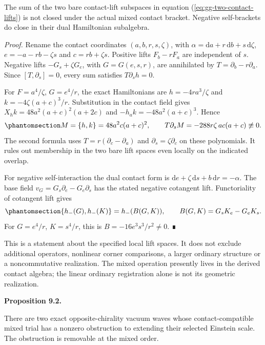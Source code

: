 \documentclass[
  english,
  11pt,
  reqno]{amsart}
\makeatletter
\newcommand{\pandocstatementheading}[1]{%
  \par\addpenalty{\@beginparpenalty}%
  \addvspace{.5\baselineskip plus .2\baselineskip minus .2\baselineskip}%
  {\normalfont\bfseries #1\par}%
  \nobreak\@afterindenttrue\@afterheading
}
\makeatother
\begin{document}
The sum of the two bare contact-lift subspaces in equation
(\ref{eq:gg-two-contact-lifts}) is not closed under the actual mixed
contact bracket. Negative self-brackets do close in their dual
Hamiltonian subalgebra.

\emph{Proof.} Rename the contact coordinates \((a,b,r,s,\zeta)\), with
\(\alpha=\mathrm da+r\,\mathrm db+s\,\mathrm d\zeta\),
\(e=-a-rb-\zeta s\) and \(c=rb+\zeta s\). Positive lifts \(F_b-rF_a\)
are independent of \(s\). Negative lifts \(-G_s+\zeta G_e\), with
\(G=G(e,s,r)\), are annihilated by \(T=\partial_b-r\partial_a\). Since
\([T,\partial_s]=0\), every sum satisfies \(T\partial_s h=0\).

For \(F=a^4/\zeta\), \(G=e^4/r\), the exact Hamiltonians are
\(h=-4ra^3/\zeta\) and \(k=-4\zeta(a+c)^3/r\). Substitution in the
contact field gives \(X_hk=48a^2(a+c)^2(a+2c)\) and
\(-h_a k=-48a^2(a+c)^3\). Hence
\begin{equation}\protect\phantomsection\label{eq:gg-mixed-nonclosure}{
 M=\{h,k\}=48a^2c(a+c)^2,\qquad
 T\partial_sM=-288r\zeta\,ac(a+c)\not\equiv0 .
}\end{equation} The second formula uses \(T=r(\partial_c-\partial_a)\)
and \(\partial_s=\zeta\partial_c\) on these polynomials. It rules out
membership in the two bare lift spaces even locally on the indicated
overlap.

For negative self-interaction the dual contact form is
\(\mathrm de+\zeta\,\mathrm ds+b\,\mathrm dr=-\alpha\). The base field
\(v_G=G_s\partial_e-G_e\partial_s\) has the stated negative cotangent
lift. Functoriality of cotangent lift gives
\begin{equation}\protect\phantomsection\label{eq:gg-negative-self-bracket}{
 \{h_-(G),h_-(K)\}=h_-(B(G,K)),\qquad
 B(G,K)=G_sK_e-G_eK_s .
}\end{equation} For \(G=e^4/r\), \(K=s^4/r\), this is
\(B=-16e^3s^3/r^2\ne0\). ∎

This is a statement about the specified local lift spaces. It does not
exclude additional operators, nonlinear corner comparisons, a larger
ordinary structure or a noncommutative realization. The mixed operation
presently lives in the derived contact algebra; the linear ordinary
registration alone is not its geometric realization.

\pandocstatementheading{\protect{}\label{prop:gg-mixed-einstein-defect}Proposition 9.2.}

There are two exact opposite-chirality vacuum waves whose
contact-compatible mixed trial has a nonzero obstruction to extending
their selected Einstein scale. The obstruction is removable at the mixed
order.
\end{document}
